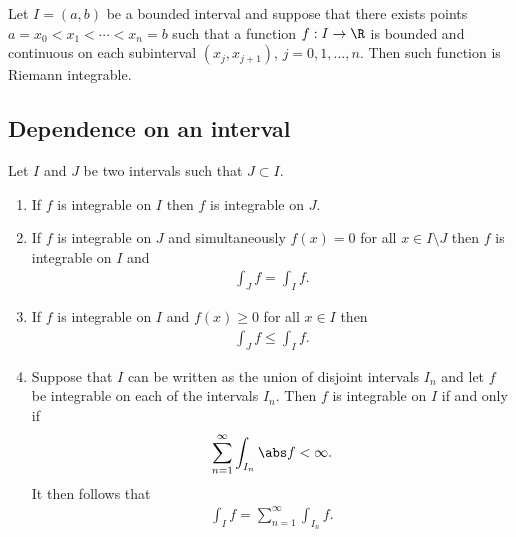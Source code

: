 \documentclass{article}
\begin{document}
\begin{corollary*}
   Let $I=(a,b)$ be a bounded interval and suppose that there exists points $a=x_0<x_1<\cdots<x_n=b$
   such that a function $f:I\to\R$ is bounded and continuous on each subinterval $(x_j,x_{j+1})$,
   $j=0,1,...,n$. Then such function is Riemann integrable.
\end{corollary*}

\subsection{Dependence on an interval}

\begin{theorem}[Notes 4.8]
    Let $I$ and $J$ be two intervals such that $J\subset I$.
    \begin{enumerate}
        \item If $f$ is integrable on $I$ then $f$ is integrable on $J$.
        \item If $f$ is integrable on $J$ and simultaneously $f(x)=0$ for all $x\in I\setminus J$
            then $f$ is integrable on $I$ and \begin{align*}
                \int_J f = \int_I f.
            \end{align*} 
        \item If $f$ is integrable on $I$ and $f(x)\geq 0$ for all $x\in I$ then \begin{align*}
            \int_J f \leq \int_I f.
        \end{align*}
        \item Suppose that $I$ can be written as the union of disjoint intervals $I_n$ and let $f$
            be integrable on each of the intervals $I_n$. Then $f$ is integrable on $I$ if and only if
            \begin{align*}
                \sum_{n=1}^\infty \int_{I_n} \abs f < \infty.
            \end{align*}
            It then follows that \begin{align*}
                \int_I f = \sum_{n=1}^\infty \int_{I_n}f.
            \end{align*}
    \end{enumerate} 
\end{theorem}
\end{document}
